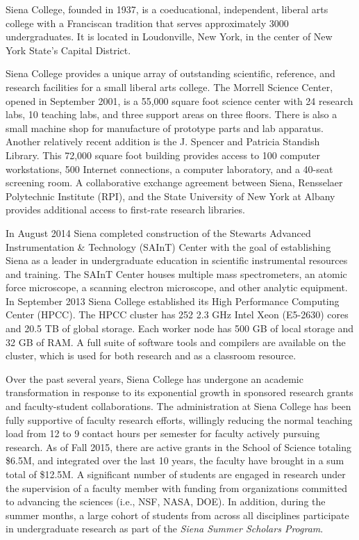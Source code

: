 \documentclass[11pt, preprint]{aastex}
\begin{document}
Siena College, founded in 1937, is a coeducational, independent, liberal arts
college with a Franciscan tradition that serves approximately 3000
undergraduates. It is located in Loudonville, New York, in the center of New
York State's Capital District.
					
Siena College provides a unique array of outstanding scientific, reference, and
research facilities for a small liberal arts college.  The Morrell Science
Center, opened in September 2001, is a 55,000 square foot science center with 24
research labs, 10 teaching labs, and three support areas on three floors.  There
is also a small machine shop for manufacture of prototype parts and lab
apparatus.  Another relatively recent addition is the J. Spencer and Patricia
Standish Library. This 72,000 square foot building provides access to 100
computer workstations, 500 Internet connections, a computer laboratory, and a
40-seat screening room. A collaborative exchange agreement between Siena,
Rensselaer Polytechnic Institute (RPI), and the State University of New York at
Albany provides additional access to first-rate research libraries.

In August 2014 Siena completed construction of the Stewarts Advanced
Instrumentation \& Technology (SAInT) Center with the goal of establishing Siena
as a leader in undergraduate education in scientific instrumental resources and
training. The SAInT Center houses multiple mass spectrometers, an atomic force
microscope, a scanning electron microscope, and other analytic equipment.  In
September 2013 Siena College established its High Performance Computing Center
(HPCC).  The HPCC cluster has 252 2.3 GHz Intel Xeon (E5-2630) cores and 20.5 TB
of global storage.  Each worker node has 500 GB of local storage and 32 GB of
RAM. A full suite of software tools and compilers are available on the cluster,
which is used for both research and as a classroom resource.

Over the past several years, Siena College has undergone an academic
transformation in response to its exponential growth in sponsored research
grants and faculty-student collaborations.  The administration at Siena College
has been fully supportive of faculty research efforts, willingly reducing the
normal teaching load from 12 to 9 contact hours per semester for faculty
actively pursuing research.  As of Fall 2015, there are active grants in the
School of Science totaling \$6.5M, and integrated over the last 10 years, the
faculty have brought in a sum total of \$12.5M.  A significant number of
students are engaged in research under the supervision of a faculty member with
funding from organizations committed to advancing the sciences (i.e., NSF,
NASA, DOE).  In addition, during the summer months, a large cohort of students from
across all disciplines participate in undergraduate research as part of the
{\em Siena Summer Scholars Program}.
	
\end{document}
